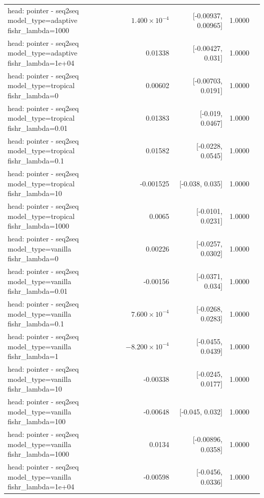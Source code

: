 \documentclass[10pt]{article}
\makeatletter
\newcommand{\stackcell}[1]{\begin{tabular}[t]{@{}l@{}}#1\end{tabular}}
\makeatother
\begin{document}
{\begin{longtable}{lrrrl}
\stackcell{head: pointer - seq2seq\\\footnotesize model\_type=adaptive fishr\_lambda=1000 } & $1.400\times10^{-4}$ & [-0.00937, 0.00965] & 1.0000 & \\
\stackcell{head: pointer - seq2seq\\\footnotesize model\_type=adaptive fishr\_lambda=1e+04 } & 0.01338 & [-0.00427, 0.031] & 1.0000 & \\
\stackcell{head: pointer - seq2seq\\\footnotesize model\_type=tropical fishr\_lambda=0 } & 0.00602 & [-0.00703, 0.0191] & 1.0000 & \\
\stackcell{head: pointer - seq2seq\\\footnotesize model\_type=tropical fishr\_lambda=0.01 } & 0.01383 & [-0.019, 0.0467] & 1.0000 & \\
\stackcell{head: pointer - seq2seq\\\footnotesize model\_type=tropical fishr\_lambda=0.1 } & 0.01582 & [-0.0228, 0.0545] & 1.0000 & \\
\stackcell{head: pointer - seq2seq\\\footnotesize model\_type=tropical fishr\_lambda=10 } & -0.001525 & [-0.038, 0.035] & 1.0000 & \\
\stackcell{head: pointer - seq2seq\\\footnotesize model\_type=tropical fishr\_lambda=1000 } & 0.0065 & [-0.0101, 0.0231] & 1.0000 & \\
\stackcell{head: pointer - seq2seq\\\footnotesize model\_type=vanilla fishr\_lambda=0 } & 0.00226 & [-0.0257, 0.0302] & 1.0000 & \\
\stackcell{head: pointer - seq2seq\\\footnotesize model\_type=vanilla fishr\_lambda=0.01 } & -0.00156 & [-0.0371, 0.034] & 1.0000 & \\
\stackcell{head: pointer - seq2seq\\\footnotesize model\_type=vanilla fishr\_lambda=0.1 } & $7.600\times10^{-4}$ & [-0.0268, 0.0283] & 1.0000 & \\
\stackcell{head: pointer - seq2seq\\\footnotesize model\_type=vanilla fishr\_lambda=1 } & $-8.200\times10^{-4}$ & [-0.0455, 0.0439] & 1.0000 & \\
\stackcell{head: pointer - seq2seq\\\footnotesize model\_type=vanilla fishr\_lambda=10 } & -0.00338 & [-0.0245, 0.0177] & 1.0000 & \\
\stackcell{head: pointer - seq2seq\\\footnotesize model\_type=vanilla fishr\_lambda=100 } & -0.00648 & [-0.045, 0.032] & 1.0000 & \\
\stackcell{head: pointer - seq2seq\\\footnotesize model\_type=vanilla fishr\_lambda=1000 } & 0.0134 & [-0.00896, 0.0358] & 1.0000 & \\
\stackcell{head: pointer - seq2seq\\\footnotesize model\_type=vanilla fishr\_lambda=1e+04 } & -0.00598 & [-0.0456, 0.0336] & 1.0000 & \\
\bottomrule
\end{longtable}
}
\end{document}
